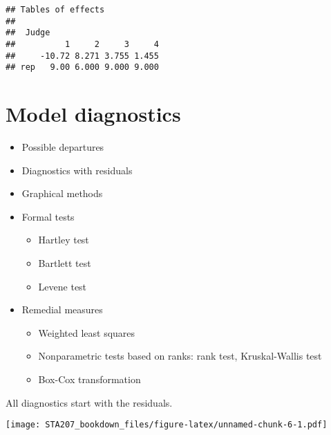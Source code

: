 \documentclass[12pt,]{book}
\newenvironment{Shaded}{\begin{snugshade}}{\end{snugshade}}
\newcommand{\KeywordTok}[1]{\textcolor[rgb]{0.13,0.29,0.53}{\textbf{#1}}}
\newcommand{\CommentTok}[1]{\textcolor[rgb]{0.56,0.35,0.01}{\textit{#1}}}
\newcommand{\OperatorTok}[1]{\textcolor[rgb]{0.81,0.36,0.00}{\textbf{#1}}}
\newcommand{\NormalTok}[1]{#1}
\providecommand{\tightlist}{%
  \setlength{\itemsep}{0pt}\setlength{\parskip}{0pt}}
\begin{document}
\begin{verbatim}
## Tables of effects
## 
##  Judge 
##          1     2     3     4
##     -10.72 8.271 3.755 1.455
## rep   9.00 6.000 9.000 9.000
\end{verbatim}

\section{Model diagnostics}\label{model-diagnostics}

\begin{itemize}
\tightlist
\item
  Possible departures
\item
  Diagnostics with residuals
\item
  Graphical methods
\item
  Formal tests

  \begin{itemize}
  \tightlist
  \item
    Hartley test
  \item
    Bartlett test
  \item
    Levene test
  \end{itemize}
\item
  Remedial measures

  \begin{itemize}
  \tightlist
  \item
    Weighted least squares
  \item
    Nonparametric tests based on ranks: rank test, Kruskal-Wallis test
  \item
    Box-Cox transformation
  \end{itemize}
\end{itemize}

All diagnostics start with the residuals.

\begin{Shaded}
\end{Shaded}

\texttt{[image: STA207\_bookdown\_files/figure-latex/unnamed-chunk-6-1.pdf]}

\begin{Shaded}
\end{Shaded}
\end{document}
